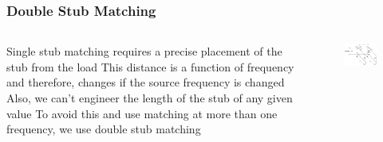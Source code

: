 \documentclass[10pt, compress]{beamer}
\begin{document}
\begin{frame}
    \frametitle{Double Stub Matching}
    \begin{columns}[]
        \begin{column}[]{.5\textwidth}
            \begin{outline}
                \1 Single stub matching requires a precise placement of the stub from the load
                \2 This distance is a function of frequency and therefore, changes if the source frequency is changed
                \2 Also, we can't engineer the length of the stub of any given value
                \1 To avoid this and use matching at more than one frequency, we use double stub matching
            \end{outline}
        \end{column}
        \begin{column}[]{.5\textwidth}
            \begin{figure}[]
                \centering
                \includegraphics[width=.9\textwidth]{tline_double_stub.pdf}
            \end{figure}
        \end{column}
    \end{columns}
\end{frame}
\end{document}
